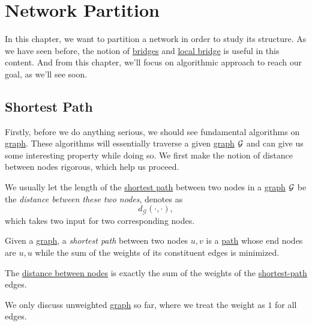 \chapter{Network Partition}
In this chapter, we want to partition a network in order to study its structure. As we have seen before, the notion of \hyperref[def:bridge]{bridges} and \hyperref[def:local-bridge]{local bridge} is useful in this content. And from this chapter, we'll focus on algorithmic approach to reach our goal, as we'll see soon.

\section{Shortest Path}
Firstly, before we do anything serious, we should see fundamental algorithms on \hyperref[def:graph]{graph}. These algorithms will essentially traverse a given \hyperref[def:graph]{graph} \(\mathcal{\MakeUppercase{g}} \) and can give us some interesting property while doing so. We first make the notion of distance between nodes rigorous, which help us proceed.

\begin{definition}\label{def:distance-between-nodes}
	We usually let the length of the \hyperref[def:shortest-path]{shortest path} between two nodes in a \hyperref[def:graph]{graph} \(\mathcal{\MakeUppercase{g}}\) be the \emph{distance between these two nodes}, denotes as
	\[
		d_{\mathcal{G}}(\cdot, \cdot),
	\]
	which takes two input for two corresponding nodes.
\end{definition}

\begin{definition}\label{def:shortest-path}
	Given a \hyperref[def:graph]{graph}, a \emph{shortest path} between two nodes \(u, v\) is a \hyperref[def:path]{path} whose end nodes are \(u, u\) while the sum of the weights of its constituent edges is minimized.
\end{definition}

\begin{remark}
	The \hyperref[def:distance-between-nodes]{distance between nodes} is exactly the sum of the weights of the \hyperref[def:shortest-path]{shortest-path} edges.
\end{remark}

\begin{note}
	We only discuss unweighted \hyperref[def:graph]{graph} so far, where we treat the weight as \(1\) for all edges.
\end{note}

